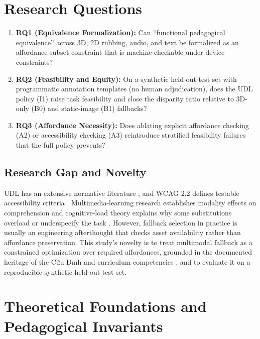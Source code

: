 \documentclass[11pt,a4paper]{article}
\begin{document}
\section{Research Questions}

\begin{enumerate}[label=\textbf{RQ\arabic*}, leftmargin=2.4em]
    \item \textbf{RQ1 (Equivalence Formalization):} Can ``functional pedagogical equivalence'' across 3D, 2D rubbing, audio, and text be formalized as an affordance-subset constraint that is machine-checkable under device constraints?
    \item \textbf{RQ2 (Feasibility and Equity):} On a synthetic held-out test set with programmatic annotation templates (no human adjudication), does the UDL policy (I1) raise task feasibility and close the disparity ratio relative to 3D-only (B0) and static-image (B1) fallbacks?
    \item \textbf{RQ3 (Affordance Necessity):} Does ablating explicit affordance checking (A2) or accessibility checking (A3) reintroduce stratified feasibility failures that the full policy prevents?
\end{enumerate}

\subsection{Research Gap and Novelty}

UDL has an extensive normative literature \cite{rose2002teaching, cast2018udl}, and WCAG 2.2 defines testable accessibility criteria \cite{w3c2023wcag}. Multimedia-learning research establishes modality effects on comprehension \cite{mayer2002multimedia} and cognitive-load theory explains why some substitutions overload or underspecify the task \cite{sweller1998cognitive}. However, fallback selection in practice is usually an engineering afterthought that checks asset availability rather than affordance preservation. This study's novelty is to treat multimodal fallback as a constrained optimization over required affordances, grounded in the documented heritage of the Cửu Đỉnh \cite{unesco2024cuudinh} and curriculum competencies \cite{moet2018gdpt}, and to evaluate it on a reproducible synthetic held-out test set.

\section{Theoretical Foundations and Pedagogical Invariants}
\end{document}
